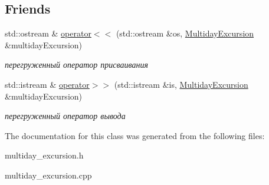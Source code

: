 \subsection*{Friends}
\begin{DoxyCompactItemize}
\item 
\hypertarget{class_multiday_excursion_ad4cff9f5a54337cfca11d2e94bf6478e}{}std\+::ostream \& \hyperlink{class_multiday_excursion_ad4cff9f5a54337cfca11d2e94bf6478e}{operator$<$$<$} (std\+::ostream \&os, \hyperlink{class_multiday_excursion}{Multiday\+Excursion} \&multiday\+Excursion)\label{class_multiday_excursion_ad4cff9f5a54337cfca11d2e94bf6478e}

\begin{DoxyCompactList}\small\item\em перегруженный оператор присваивания \end{DoxyCompactList}\item 
\hypertarget{class_multiday_excursion_a154defda96fd2b2c3dad2abf8cfd6fb8}{}std\+::istream \& \hyperlink{class_multiday_excursion_a154defda96fd2b2c3dad2abf8cfd6fb8}{operator$>$$>$} (std\+::istream \&is, \hyperlink{class_multiday_excursion}{Multiday\+Excursion} \&multiday\+Excursion)\label{class_multiday_excursion_a154defda96fd2b2c3dad2abf8cfd6fb8}

\begin{DoxyCompactList}\small\item\em перегруженный оператор вывода \end{DoxyCompactList}\end{DoxyCompactItemize}


The documentation for this class was generated from the following files\+:\begin{DoxyCompactItemize}
\item 
multiday\+\_\+excursion.\+h\item 
multiday\+\_\+excursion.\+cpp\end{DoxyCompactItemize}
